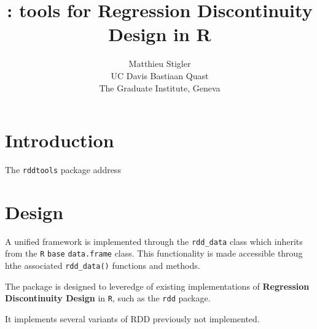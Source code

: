 \documentclass[article]{jss}
\author{
Matthieu Stigler\\UC Davis \And Bastiaan Quast\\The Graduate Institute, Geneva
}
\title{\pkg{rddtools}: tools for Regression Discontinuity Design in R}
\begin{document}
\section{Introduction}\label{introduction}

The \texttt{rddtools} package address

\section{Design}\label{design}

A unified framework is implemented through the \texttt{rdd\_data} class
which inherits from the \texttt{R} \texttt{base} \texttt{data.frame}
class. This functionality is made accessible throug hthe associated
\texttt{rdd\_data()} functions and methods.

The package is designed to leveredge of existing implementations of
\textbf{Regression Discontinuity Design} in \texttt{R}, such as the
\texttt{rdd} package.

It implements several variants of RDD previously not implemented.
\end{document}
